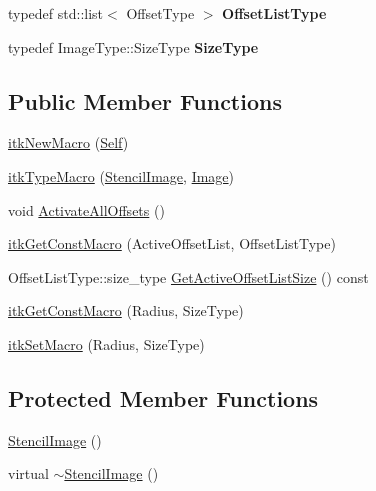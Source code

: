 \begin{DoxyCompactItemize}
\item 
\hypertarget{classitk_1_1mad_1_1_stencil_image_aceb14d8286df6cc90aecfedf018866b2}{typedef std\-::list$<$ Offset\-Type $>$ {\bfseries Offset\-List\-Type}}\label{classitk_1_1mad_1_1_stencil_image_aceb14d8286df6cc90aecfedf018866b2}

\item 
\hypertarget{classitk_1_1mad_1_1_stencil_image_a0198ac532d563c49c83b52dbc5666db9}{typedef Image\-Type\-::\-Size\-Type {\bfseries Size\-Type}}\label{classitk_1_1mad_1_1_stencil_image_a0198ac532d563c49c83b52dbc5666db9}

\end{DoxyCompactItemize}
\subsection*{Public Member Functions}
\begin{DoxyCompactItemize}
\item 
\hyperlink{classitk_1_1mad_1_1_stencil_image_a954e0ebaabb189c36354f82542f3acec}{itk\-New\-Macro} (\hyperlink{classitk_1_1mad_1_1_stencil_image_a3cd288ed59c1431bf14b735b995cf58c}{Self})
\item 
\hyperlink{classitk_1_1mad_1_1_stencil_image_a951543783bd9bdd9074e569fc72c0dca}{itk\-Type\-Macro} (\hyperlink{classitk_1_1mad_1_1_stencil_image}{Stencil\-Image}, \hyperlink{class_image}{Image})
\item 
void \hyperlink{classitk_1_1mad_1_1_stencil_image_a58c14a128e9348f27d64434373d26b90}{Activate\-All\-Offsets} ()
\item 
\hyperlink{classitk_1_1mad_1_1_stencil_image_a7680f0a93498d9f39f303160c457c410}{itk\-Get\-Const\-Macro} (Active\-Offset\-List, Offset\-List\-Type)
\item 
Offset\-List\-Type\-::size\-\_\-type \hyperlink{classitk_1_1mad_1_1_stencil_image_ab783f408069969cebf420730541bb6a4}{Get\-Active\-Offset\-List\-Size} () const 
\item 
\hyperlink{classitk_1_1mad_1_1_stencil_image_abe294bd353e53fcf37cbfb442ae1cfdc}{itk\-Get\-Const\-Macro} (Radius, Size\-Type)
\item 
\hyperlink{classitk_1_1mad_1_1_stencil_image_a053e227d7c8891c5dd2e4a0722977694}{itk\-Set\-Macro} (Radius, Size\-Type)
\end{DoxyCompactItemize}
\subsection*{Protected Member Functions}
\begin{DoxyCompactItemize}
\item 
\hyperlink{classitk_1_1mad_1_1_stencil_image_a5034dab56f499ea99139b4798ed12a19}{Stencil\-Image} ()
\item 
virtual \hyperlink{classitk_1_1mad_1_1_stencil_image_ac8bdf1a707f80129e37a9cf6fcf32650}{$\sim$\-Stencil\-Image} ()
\end{DoxyCompactItemize}


